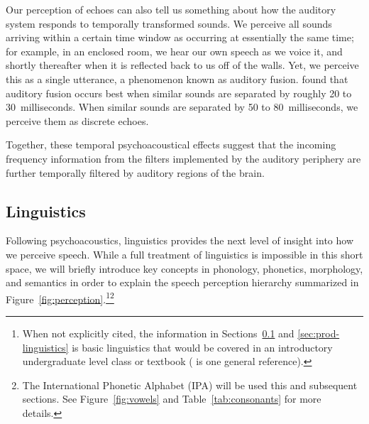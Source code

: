 Our perception of echoes can also tell us
something about how the auditory system
responds to temporally transformed sounds.
We perceive all sounds arriving within
a certain time window as occurring at essentially
the same time;
for example, in an enclosed room,
we hear our own speech as we voice it,
and shortly thereafter when it is reflected
back to us off of the walls.
Yet, we perceive this as a single utterance,
a phenomenon known as auditory fusion.
\citet{haas1972} found that auditory fusion occurs
best when similar sounds are separated by roughly
20 to 30~milliseconds.
When similar sounds are separated by 50 to 80~milliseconds,
we perceive them as discrete echoes.

Together, these temporal psychoacoustical effects
suggest that the incoming frequency information
from the filters implemented by the auditory periphery
are further temporally filtered
by auditory regions of the brain.

\subsection{Linguistics}
\label{sec:perc-linguistics}

Following psychoacoustics,
linguistics provides
the next level of insight into
how we perceive speech.
While a full treatment of linguistics
is impossible in this short space,
we will briefly introduce
key concepts in phonology,
phonetics, morphology, and semantics
in order to
explain the speech perception hierarchy
summarized in Figure~\ref{fig:perception}.\footnote{
  When not explicitly cited,
  the information in Sections~\ref{sec:perc-linguistics}
  and \ref{sec:prod-linguistics}
  is basic linguistics
  that would be covered in an
  introductory undergraduate level
  class or textbook
  (\citet{roach2010} is one general reference).
}\footnote{The International Phonetic Alphabet (IPA)
  will be used this and subsequent sections.
  See Figure~\ref{fig:vowels} and Table~\ref{tab:consonants}
  for more details.}


